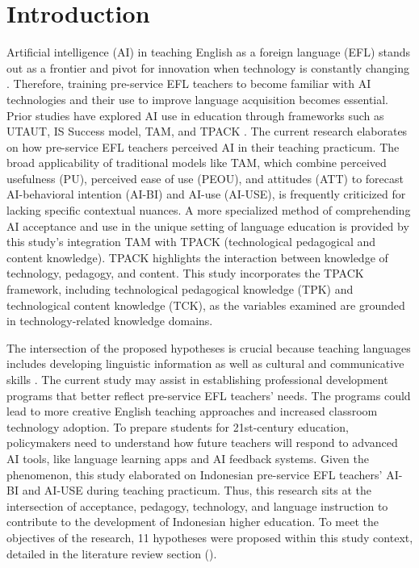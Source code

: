 \documentclass[english]{textolivre}
\begin{document}
\section{Introduction}\label{sec-intro}
Artificial intelligence (AI) in teaching English as a foreign language (EFL) stands out as a frontier and pivot for innovation when technology is constantly changing \cite{darwin2024critical}. Therefore, training pre-service EFL teachers to become familiar with AI technologies and their use to improve language acquisition becomes essential.  Prior studies have explored AI use in education through frameworks such as UTAUT, IS Success model, TAM, and TPACK \cite{ma2024tam,venkatesh2022utaut,yoon2023aispeakers}. The current research elaborates on how pre-service EFL teachers perceived AI in their teaching practicum. The broad applicability of traditional models like TAM, which combine perceived usefulness (PU), perceived ease of use (PEOU), and attitudes (ATT) to forecast AI-behavioral intention (AI-BI) and AI-use (AI-USE), is frequently criticized for lacking specific contextual nuances. A more specialized method of comprehending AI acceptance and use in the unique setting of language education is provided by this study’s integration TAM with TPACK (technological pedagogical and content knowledge). TPACK highlights the interaction between knowledge of technology, pedagogy, and content. This study incorporates the TPACK framework, including technological pedagogical knowledge (TPK) and technological content knowledge (TCK), as the variables examined are grounded in technology-related knowledge domains.

The intersection of the proposed hypotheses is crucial because teaching languages includes developing linguistic information as well as cultural and communicative skills \cite{aladwan2024useintention}. The current study may assist in establishing professional development programs that better reflect pre-service EFL teachers’ needs. The programs could lead to more creative English teaching approaches and increased classroom technology adoption. To prepare students for 21st-century education, policymakers need to understand how future teachers will respond to advanced AI tools, like language learning apps and AI feedback systems. Given the phenomenon, this study elaborated on Indonesian pre-service EFL teachers’ AI-BI and AI-USE during teaching practicum. Thus, this research sits at the intersection of acceptance, pedagogy, technology, and language instruction to contribute to the development of Indonesian higher education. To meet the objectives of the research, 11 hypotheses were proposed within this study context, detailed in the literature review section ().
\end{document}
